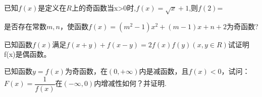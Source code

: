 \begin{example}
	已知$f(x)$是定义在$R$上的奇函数当x>0时,$f(x)=\sqrt{x}+1$,则$f(2)$=\underline{\qquad}
\end{example}
\begin{example}
是否存在常数$m,n$，使函数$f(x)=(m^2-1)x^2+(m-1)x+n+2$为奇函数?
\end{example}
\vspace{2.5cm}
\begin{example}
已知函数$f(x)$满足$f(x+y)+f(x-y)=2f(x)f(y)(x,y\in R)$试证明f(x)是偶函数。
\end{example}
\vspace{2.5cm}
\begin{example}
已知函数$y=f(x)$为奇函数，在$(0,+\infty)$内是减函数，且$f(x)<0$，试问：$F(x)=\dfrac{1}{f(x)}$在$(-\infty,0)$内增减性如何？并证明.
\end{example}